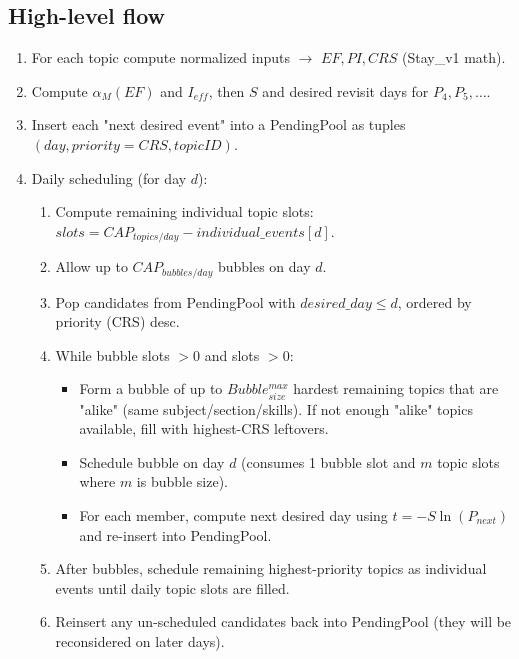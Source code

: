 \documentclass[11pt]{article}
\begin{document}
\subsection{High-level flow}
\begin{enumerate}
  \item For each topic compute normalized inputs $\rightarrow$ $EF, PI, CRS$ (Stay\_v1 math).
  \item Compute $\alpha_M(EF)$ and $I_{eff}$, then $S$ and desired revisit days for $P_4,P_5,\dots$.
  \item Insert each "next desired event" into a PendingPool as tuples $(day, priority=CRS, topicID)$.
  \item Daily scheduling (for day $d$):
    \begin{enumerate}
      \item Compute remaining individual topic slots: $slots = CAP_{topics/day} - individual\_events[d]$.
      \item Allow up to $CAP_{bubbles/day}$ bubbles on day $d$.
      \item Pop candidates from PendingPool with $desired\_day \le d$, ordered by priority (CRS) desc.
      \item While bubble slots $>0$ and slots $>0$:
        \begin{itemize}
          \item Form a bubble of up to $Bubble_{size}^{max}$ hardest remaining topics that are "alike" (same subject/section/skills). If not enough "alike" topics available, fill with highest-CRS leftovers.
          \item Schedule bubble on day $d$ (consumes 1 bubble slot and $m$ topic slots where $m$ is bubble size).
          \item For each member, compute next desired day using $t=-S\ln(P_{next})$ and re-insert into PendingPool.
        \end{itemize}
      \item After bubbles, schedule remaining highest-priority topics as individual events until daily topic slots are filled.
      \item Reinsert any un-scheduled candidates back into PendingPool (they will be reconsidered on later days).
    \end{enumerate}
\end{enumerate}
\end{document}
